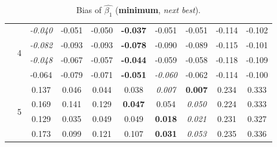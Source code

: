 \documentclass[authoryear, review, 11pt]{elsarticle}
\begin{document}
\begin{table}
\begin{center}
{\begin{tabular}{cccccccccc}
  \cline{3-10}
   & \multirow{4}{*}{4} & \emph{-0.040} & -0.051 & -0.050 & \textbf{-0.037} & -0.051 & -0.051 & -0.114 & -0.102 \\ 
   &  & \emph{-0.082} & -0.093 & -0.093 & \textbf{-0.078} & -0.090 & -0.089 & -0.115 & -0.101 \\ 
   &  & \emph{-0.048} & -0.067 & -0.057 & \textbf{-0.044} & -0.059 & -0.058 & -0.118 & -0.109 \\ 
   &  & -0.064 & -0.079 & -0.071 & \textbf{-0.051} & \emph{-0.060} & -0.062 & -0.114 & -0.100 \\ 
  \cline{3-10}
   & \multirow{4}{*}{5} & 0.137 & 0.046 & 0.044 & 0.038 & \emph{0.007} & \textbf{0.007} & 0.234 & 0.333 \\ 
   &  & 0.169 & 0.141 & 0.129 & \textbf{0.047} & 0.054 & \emph{0.050} & 0.224 & 0.333 \\ 
   &  & 0.129 & 0.035 & 0.049 & 0.049 & \textbf{0.018} & \emph{0.021} & 0.231 & 0.327 \\ 
   &  & 0.173 & 0.099 & 0.121 & 0.107 & \textbf{0.031} & \emph{0.053} & 0.235 & 0.336 \\ 
  \end{tabular}}
\caption{Bias of $\hat{\beta_1}$ (\textbf{minimum}, \emph{next best}).\label{table:X1-bias}}
		\end{center}
		\end{table}	

		
		
\end{document}

